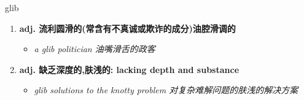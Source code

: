 
\begin{frame}
{\huge glib}
\begin{center}
\begin{enumerate}\Large
  \item \textbf{adj. 流利圆滑的(常含有不真诚或欺诈的成分)油腔滑调的}
  \begin{itemize}
    \item \em{\Large{a glib politician 油嘴滑舌的政客}}
  \end{itemize}
  \item \textbf{adj. 缺乏深度的,肤浅的: lacking depth and substance}
  \begin{itemize}
    \item \em{\Large{glib solutions to the knotty problem 对复杂难解问题的肤浅的解决方案}}
  \end{itemize}
\end{enumerate}
\end{center}
\end{frame}
